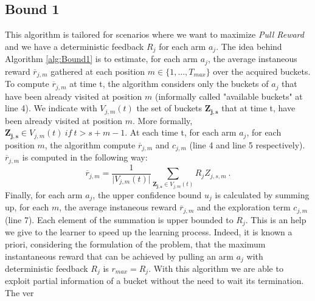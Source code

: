 \subsection{Bound 1}
This algorithm is tailored for scenarios where we want to maximize \emph{Pull Reward} and we have a deterministic feedback $R_j$ for each arm $a_j$. The idea behind Algorithm \ref{alg:Bound1} is to estimate, for each arm $a_j$, the average instaneous reward $\overline{r}_{j,m}$ gathered at each position $m \in \{1, \ldots,T_{max}\}$ over the acquired buckets.
To compute $\overline{r}_{j,m}$ at time t, the algorithm considers only the buckets of $a_j$ that have been already visited at position $m$ (informally called "available buckets" at line 4). We indicate with $V_{j,m}(t)$ the set of buckets $\boldsymbol{Z_{j,s}}$ that at time t, have been already visited at position $m$. More formally,  $\boldsymbol{Z_{j,s}} \in V_{j,m}(t) \ if \ t>s+m-1$. At each time t, for each arm $a_j$, for each position $m$, the algorithm compute $\overline{r}_{j,m}$ and $c_{j,m}$ (line 4 and line 5 respectively). $\overline{r}_{j,m}$ is computed in the following way: $$\overline{r}_{j,m} = \frac{1}{\vert V_{j,m}(t) \vert} \sum_{\boldsymbol{Z_{j,s}} \in V_{j,m}(t)} R_jZ_{j,s,m}\ .$$
Finally, for each arm $a_j$, the upper confidence bound $u_j$ is calculated by summing up, for each $m$, the average instaneous reward $\overline{r}_{j,m}$ and the exploration term  $c_{j,m}$  (line 7). Each element of the summation is upper bounded to $R_j$. This is an help we give to the learner to speed up the learning process. Indeed, it is known a priori, considering the formulation of the problem, that the maximum instantaneous reward that can be achieved by pulling an arm $a_j$ with deterministic feedback $R_j$ is $r_{max} = R_j$. With this algorithm we are able to exploit partial information of a bucket without the need to wait its termination. The ver










